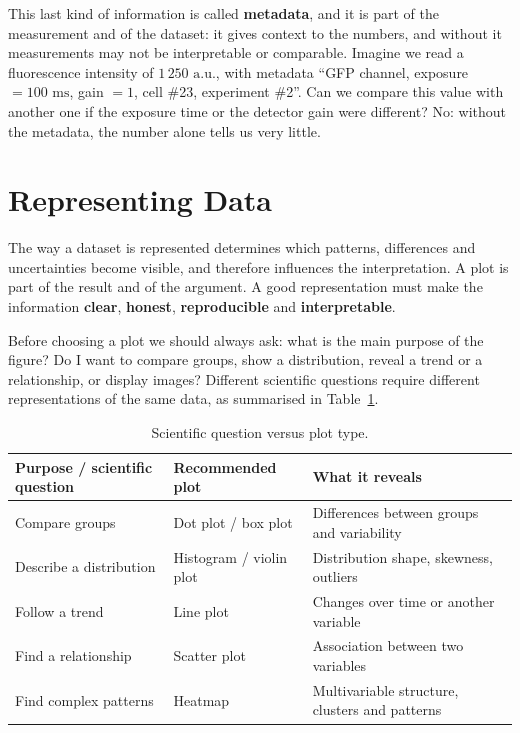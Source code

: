 \documentclass[letterpaper,11pt,leqno]{book}
\begin{document}
This last kind of information is called \textbf{metadata}, and it is part of the measurement and of the dataset: it gives context to the numbers, and without it measurements may not be interpretable or comparable. Imagine we read a fluorescence intensity of $1\,250\text{ a.u.}$, with metadata ``GFP channel, exposure $= 100\text{ ms}$, gain $= 1$, cell \#23, experiment \#2''. Can we compare this value with another one if the exposure time or the detector gain were different? No: without the metadata, the number alone tells us very little.

\section{Representing Data}
\label{sec:representation}

The way a dataset is represented determines which patterns, differences and uncertainties become visible, and therefore influences the interpretation. A plot is part of the result and of the argument. A good representation must make the information \textbf{clear}, \textbf{honest}, \textbf{reproducible} and \textbf{interpretable}.

Before choosing a plot we should always ask: what is the main purpose of the figure? Do I want to compare groups, show a distribution, reveal a trend or a relationship, or display images? Different scientific questions require different representations of the same data, as summarised in Table~\ref{tab:graphical_paradigms}.

\begin{table}[!htbp]
\centering
\caption{Scientific question versus plot type.}
\label{tab:graphical_paradigms}
\begin{tabular*}{\textwidth}{p{3.8cm}@{\extracolsep\fill}p{3.8cm}p{6.0cm}}
\toprule
Purpose / scientific question & Recommended plot & What it reveals \\
\midrule
Compare groups & Dot plot / box plot & Differences between groups and variability \\
Describe a distribution & Histogram / violin plot & Distribution shape, skewness, outliers \\
Follow a trend & Line plot & Changes over time or another variable \\
Find a relationship & Scatter plot & Association between two variables \\
Find complex patterns & Heatmap & Multivariable structure, clusters and patterns \\
\bottomrule
\end{tabular*}
\end{table}
\end{document}
